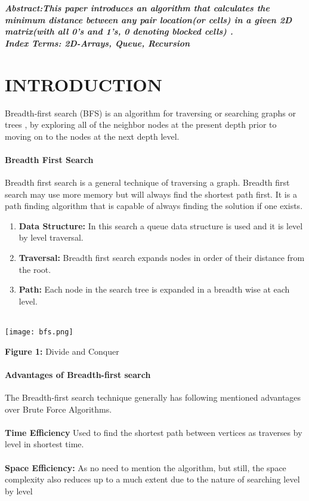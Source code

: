 \documentclass[10pt]{article}
\begin{document}
\begin{multicols*}{2}

    \textbf{\emph{{Abstract}:This paper introduces an algorithm that calculates the minimum  distance between any pair location(or cells) in a given 2D matrix(with all 0’s and 1’s, 0 denoting blocked cells) .
}}\\
	
	\textbf{\emph{{Index Terms}: 2D-Arrays, Queue, Recursion\\}}


\section*{INTRODUCTION}
 

Breadth-first search (BFS) is an algorithm for traversing or searching graphs or trees , by exploring all of the neighbor nodes at the present depth prior to moving on to the nodes at the next depth level.



\paragraph{Breadth First Search}

Breadth first search is a general technique of traversing a graph. Breadth first search may use more memory but will always find the shortest path first. It is a path finding algorithm that is capable of always finding the solution if one exists.


\begin{enumerate}
    \item\textbf{Data Structure:}  In this search a queue data structure is used and it is level by level traversal.
    \item\textbf{Traversal:}  Breadth first search expands nodes in order of their distance from the root.
    \item\textbf{Path:} Each node in the search tree is expanded in a breadth wise at each level.\\\\
\end{enumerate}

\texttt{[image: bfs.png]}\begin{center}\textbf{Figure 1:} Divide and Conquer\end{center}


\paragraph{Advantages of Breadth-first search}
The Breadth-first search technique generally has following mentioned advantages over Brute Force Algorithms.\\\\
\textbf{Time Efficiency} Used to find the shortest path between vertices as traverses by level in shortest time.\\\\
\textbf{Space Efficiency:} As no need to mention the algorithm,  but still, the space complexity also reduces up to a much extent due to the nature of searching level by level\\


\end{multicols*}
\end{document}
